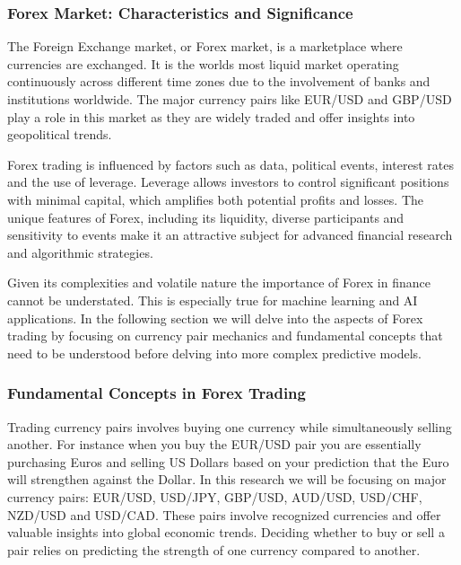 \subsubsection{Forex Market: Characteristics and Significance}
The Foreign Exchange market, or Forex market, is a marketplace where currencies are exchanged. It is the worlds most liquid market operating continuously across different time zones due to the involvement of banks and institutions worldwide. The major currency pairs like EUR/USD and GBP/USD play a role in this market as they are widely traded and offer insights into geopolitical trends.

Forex trading is influenced by factors such as data, political events, interest rates and the use of leverage. Leverage allows investors to control significant positions with minimal capital, which amplifies both potential profits and losses. The unique features of Forex, including its liquidity, diverse participants and sensitivity to events make it an attractive subject for advanced financial research and algorithmic strategies.

Given its complexities and volatile nature the importance of Forex in finance cannot be understated. This is especially true for machine learning and AI applications. In the following section we will delve into the aspects of Forex trading by focusing on currency pair mechanics and fundamental concepts that need to be understood before delving into more complex predictive models.

\subsubsection{Fundamental Concepts in Forex Trading}
Trading currency pairs involves buying one currency while simultaneously selling another. For instance when you buy the EUR/USD pair you are essentially purchasing Euros and selling US Dollars based on your prediction that the Euro will strengthen against the Dollar. In this research we will be focusing on major currency pairs: EUR/USD, USD/JPY, GBP/USD, AUD/USD, USD/CHF, NZD/USD and USD/CAD. These pairs involve recognized currencies and offer valuable insights into global economic trends. Deciding whether to buy or sell a pair relies on predicting the strength of one currency compared to another.

